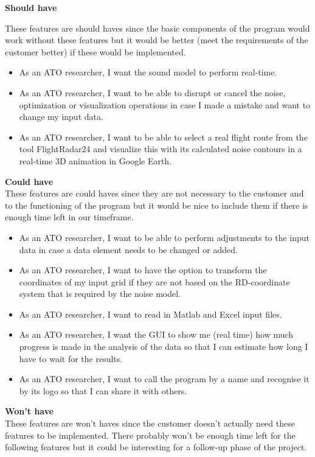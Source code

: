 \documentclass[a4paper,english,fleqn]{exam}
\begin{document}
\newpage

\textbf{Should have}

These features are should haves since the basic components of the program would work without these features but it would be better (meet the requirements of the customer better) if these would be implemented. 

\begin{itemize}
\item As an ATO researcher, I want the sound model to perform real-time.
\item As an ATO researcher, I want to be able to disrupt or cancel the noise, optimization or visualization operations in case I made a mistake and want to change my input data.
\item As an ATO researcher, I want to be able to select a real flight route from the tool FlightRadar24 and visualize this with its calculated noise contours in a real-time 3D animation in Google Earth.
\end{itemize}

\textbf{Could have} \\
These features are could haves since they are not necessary to the customer and to the functioning of the program but it would be nice to include them if there is enough time left in our timeframe. 

\begin{itemize}
\item As an ATO researcher, I want to be able to perform adjustments to the input data in case a data element needs to be changed or added. 
\item As an ATO researcher, I want to have the option to transform the coordinates of my input grid if they are not based on the RD-coordinate system that is required by the noise model.
\item As an ATO researcher, I want to read in Matlab and Excel input files.
\item As an ATO researcher, I want the GUI to show me (real time) how much progress is made in the analysis of the data so that I can estimate how long I have to wait for the results.
\item As an ATO researcher, I want to call the program by a name and recognise it by its logo so that I can share it with others.
\end{itemize}

\textbf{Won't have} \\
These features are won't haves since the customer doesn't actually need these features to be implemented. There probably won't be enough time left for the following features but it could be interesting for a follow-up phase of the project. 
\end{document}
